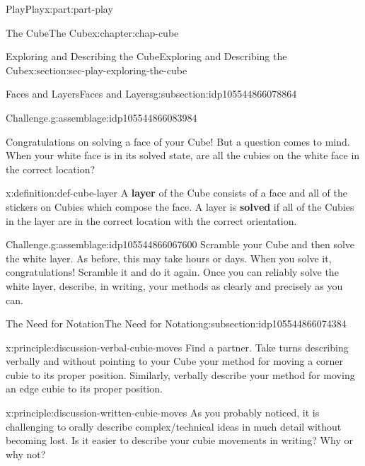 \documentclass[oneside,10pt,]{book}
\newcommand{\terminology}[1]{\textbf{#1}}
\numberwithin{equation}{section}
\begin{document}
\begin{partptx}{Play}{}{Play}{}{}{x:part:part-play}
\begin{chapterptx}{The Cube}{}{The Cube}{}{}{x:chapter:chap-cube}
\begin{sectionptx}{Exploring and Describing the Cube}{}{Exploring and Describing the Cube}{}{}{x:section:sec-play-exploring-the-cube}
\begin{subsectionptx}{Faces and Layers}{}{Faces and Layers}{}{}{g:subsection:idp105544866078864}
\begin{assemblage}{Challenge.}{g:assemblage:idp105544866083984}
\end{assemblage}
Congratulations on solving a face of your Cube! But a question comes to mind. When your white face is in its solved state, are all the cubies on the white face in the correct location?%
\begin{definition}{}{x:definition:def-cube-layer}%
%
A \terminology{layer} of the Cube consists of a face and all of the stickers on Cubies which compose the face. A layer is \terminology{solved} if all of the Cubies in the layer are in the correct location with the correct orientation.%
\end{definition}
\begin{assemblage}{Challenge.}{g:assemblage:idp105544866067600}%
Scramble your Cube and then solve the white layer. As before, this may take hours or days. When you solve it, congratulations! Scramble it and do it again. Once you can reliably solve the white layer, describe, in writing, your methods as clearly and precisely as you can.%
\end{assemblage}
\end{subsectionptx}
%
%
\typeout{************************************************}
\typeout{************************************************}
%
\begin{subsectionptx}{The Need for Notation}{}{The Need for Notation}{}{}{g:subsection:idp105544866074384}
\begin{principle}{}{}{x:principle:discussion-verbal-cubie-moves}%
Find a partner. Take turns describing verbally and without pointing to your Cube your method for moving a corner cubie to its proper position. Similarly, verbally describe your method for moving an edge cubie to its proper position.%
\end{principle}
\begin{principle}{}{}{x:principle:discussion-written-cubie-moves}%
As you probably noticed, it is challenging to orally describe complex\slash{}technical ideas in much detail without becoming lost. Is it easier to describe your cubie movements in writing? Why or why not?%
\end{principle}

\end{subsectionptx}
\end{sectionptx}
\end{chapterptx}
\end{partptx}
\end{document}
